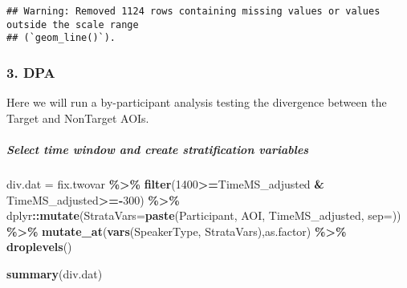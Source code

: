 \documentclass[
]{article}
\newenvironment{Shaded}{\begin{snugshade}}{\end{snugshade}}
\newcommand{\AttributeTok}[1]{\textcolor[rgb]{0.13,0.29,0.53}{#1}}
\newcommand{\DecValTok}[1]{\textcolor[rgb]{0.00,0.00,0.81}{#1}}
\newcommand{\FunctionTok}[1]{\textcolor[rgb]{0.13,0.29,0.53}{\textbf{#1}}}
\newcommand{\NormalTok}[1]{#1}
\newcommand{\OtherTok}[1]{\textcolor[rgb]{0.56,0.35,0.01}{#1}}
\newcommand{\SpecialCharTok}[1]{\textcolor[rgb]{0.81,0.36,0.00}{\textbf{#1}}}
\newcommand{\StringTok}[1]{\textcolor[rgb]{0.31,0.60,0.02}{#1}}
\begin{document}
\begin{verbatim}
## Warning: Removed 1124 rows containing missing values or values outside the scale range
## (`geom_line()`).
\end{verbatim}

\subsubsection{3. DPA}\label{dpa}

Here we will run a by-participant analysis testing the divergence
between the Target and NonTarget AOIs.

\subparagraph{Select time window and create stratification
variables}\label{select-time-window-and-create-stratification-variables}

\begin{Shaded}
\begin{Highlighting}[]
\NormalTok{div.dat }\OtherTok{=}\NormalTok{ fix.twovar }\SpecialCharTok{\%\textgreater{}\%}  
  \FunctionTok{filter}\NormalTok{(}\DecValTok{1400}\SpecialCharTok{\textgreater{}=}\NormalTok{TimeMS\_adjusted }\SpecialCharTok{\&}\NormalTok{ TimeMS\_adjusted}\SpecialCharTok{\textgreater{}={-}}\DecValTok{300}\NormalTok{) }\SpecialCharTok{\%\textgreater{}\%} 
\NormalTok{  dplyr}\SpecialCharTok{::}\FunctionTok{mutate}\NormalTok{(}\AttributeTok{StrataVars=}\FunctionTok{paste}\NormalTok{(Participant, AOI, TimeMS\_adjusted, }\AttributeTok{sep=}\StringTok{\textquotesingle{}\textquotesingle{}}\NormalTok{)) }\SpecialCharTok{\%\textgreater{}\%} 
  \FunctionTok{mutate\_at}\NormalTok{(}\FunctionTok{vars}\NormalTok{(SpeakerType, StrataVars),as.factor) }\SpecialCharTok{\%\textgreater{}\%} 
  \FunctionTok{droplevels}\NormalTok{()}

\FunctionTok{summary}\NormalTok{(div.dat)}
\end{Highlighting}
\end{Shaded}
\end{document}
